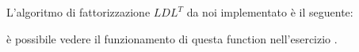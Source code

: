 \begin{flushleft}
L'algoritmo di fattorizzazione $LDL^T$ da noi implementato è il seguente:

è possibile vedere il funzionamento di questa function nell'esercizio \pageref{es313}.
\end{flushleft}
